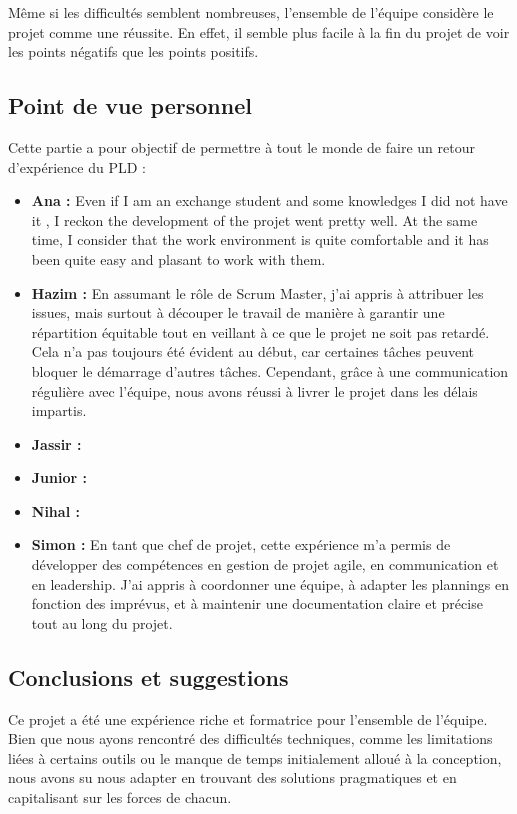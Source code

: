 \documentclass[a4paper]{article}
\begin{document}
Même si les difficultés semblent nombreuses, l'ensemble de l'équipe considère le projet comme une réussite. En effet, il semble plus facile à la fin du projet de voir les points négatifs que les points positifs.

\subsection{Point de vue personnel}
Cette partie a pour objectif de permettre à tout le monde de faire un retour d'expérience du PLD :
\begin{itemize}
    \item \textbf{Ana : }Even if I am an exchange student and some knowledges I did not have it , I reckon the development of the projet went pretty well. At the same time, I consider that the work environment is quite comfortable and it has been quite easy and plasant to work with them.
    \item \textbf{Hazim : } En assumant le rôle de Scrum Master, j’ai appris à attribuer les issues, mais surtout à découper le travail de manière à garantir une répartition équitable tout en veillant à ce que le projet ne soit pas retardé. Cela n’a pas toujours été évident au début, car certaines tâches peuvent bloquer le démarrage d’autres tâches. Cependant, grâce à une communication régulière avec l’équipe, nous avons réussi à livrer le projet dans les délais impartis.
    \item \textbf{Jassir : }
    \item \textbf{Junior : }
    \item \textbf{Nihal : }
    \item \textbf{Simon :} En tant que chef de projet, cette expérience m'a permis de développer des compétences en gestion de projet agile, en communication et en leadership. J'ai appris à coordonner une équipe, à adapter les plannings en fonction des imprévus, et à maintenir une documentation claire et précise tout au long du projet.
\end{itemize}


\subsection{Conclusions et suggestions}
Ce projet a été une expérience riche et formatrice pour l’ensemble de l’équipe. Bien que nous ayons rencontré des difficultés techniques, comme les limitations liées à certains outils ou le manque de temps initialement alloué à la conception, nous avons su nous adapter en trouvant des solutions pragmatiques et en capitalisant sur les forces de chacun. \\
\end{document}
